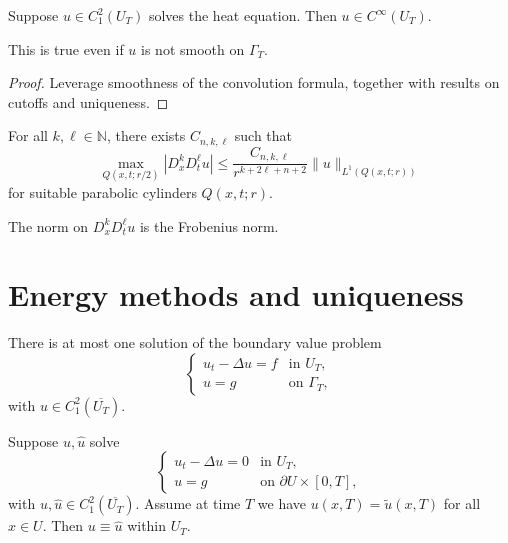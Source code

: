 \begin{theorem}[Smoothness]
Suppose
$
u\in C_1^2(U_T)
$
solves the heat equation. Then
$
u\in C^\infty(U_T).
$
\end{theorem}

\begin{remark}
This is true even if $u$ is not smooth on $\Gamma_T$.
\end{remark}

\begin{proof}
Leverage smoothness of the convolution formula, together with results on cutoffs and uniqueness.
\end{proof}

\begin{theorem}
For all $k,\ell\in \mathbb{N}$, there exists $C_{n,k,\ell}$ such that
$$
\max_{Q(x,t;r/2)}\left|D_x^kD_t^\ell u\right|
\le
\frac{C_{n,k,\ell}}{r^{k+2\ell+n+2}}
\|u\|_{L^1(Q(x,t;r))}
$$
for suitable parabolic cylinders $Q(x,t;r)$.
\end{theorem}

\begin{remark}
The norm on $D_x^kD_t^\ell u$ is the Frobenius norm.
\end{remark}

\section{Energy methods and uniqueness}

\begin{theorem}[Uniqueness]
There is at most one solution of the boundary value problem
$$
\begin{cases}
u_t-\Delta u=f & \text{in } U_T,\\
u=g & \text{on } \Gamma_T,
\end{cases}
$$
with
$
u\in C_1^2(\overline{U_T}).
$
\end{theorem}


\begin{theorem}
Suppose $u,\hat{u}$ solve
$$
\begin{cases}
u_t-\Delta u=0 & \text{in } U_T,\\
u=g & \text{on } \partial U\times [0,T],
\end{cases}
$$
with
$
u,\hat{u}\in C_1^2(\overline{U_T}).
$
Assume at time $T$ we have $u(x,T)=\tilde{u}(x,T)$ for all $x\in U$.
Then
$
u\equiv \hat{u}
$
within $U_T$.

\end{theorem}
